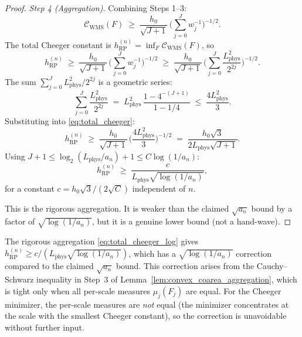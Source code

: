 \begin{proof}
\emph{Step 4 (Aggregation).} Combining Steps 1--3:
\begin{equation}
\label{eq:aggregation}
  \mathcal{C}_{\mathrm{WMS}}(F)
  \;\ge\;\frac{h_{0}}{\sqrt{J+1}}\,
  \biggl(\sum_{j=0}^{J}w_{j}^{-1}\biggr)^{-1/2}.
\end{equation}
The total Cheeger constant is
$h_{\mathrm{RP}}^{(n)}=\inf_{F}\mathcal{C}_{\mathrm{WMS}}(F)$, so
\begin{equation}
\label{eq:total_cheeger}
  h_{\mathrm{RP}}^{(n)}
  \;\ge\;\frac{h_{0}}{\sqrt{J+1}}\,
  \biggl(\sum_{j=0}^{J}w_{j}^{-1}\biggr)^{-1/2}
  \;\ge\;\frac{h_{0}}{\sqrt{J+1}}\,
  \biggl(\sum_{j=0}^{J}\frac{L_{\mathrm{phys}}^{2}}{2^{2j}}
  \biggr)^{-1/2}.
\end{equation}
The sum $\sum_{j=0}^{J}L_{\mathrm{phys}}^{2}/2^{2j}$ is a
geometric series:
\begin{equation}
\label{eq:geom_sum}
  \sum_{j=0}^{J}\frac{L_{\mathrm{phys}}^{2}}{2^{2j}}
  \;=\;L_{\mathrm{phys}}^{2}\,\frac{1-4^{-(J+1)}}{1-1/4}
  \;\le\;\frac{4L_{\mathrm{phys}}^{2}}{3}.
\end{equation}
Substituting into \eqref{eq:total_cheeger}:
\begin{equation}
\label{eq:total_cheeger_final}
  h_{\mathrm{RP}}^{(n)}
  \;\ge\;\frac{h_{0}}{\sqrt{J+1}}\,
  \biggl(\frac{4L_{\mathrm{phys}}^{2}}{3}\biggr)^{-1/2}
  \;=\;\frac{h_{0}\sqrt{3}}{2L_{\mathrm{phys}}\sqrt{J+1}}.
\end{equation}
Using $J+1\le\log_{2}(L_{\mathrm{phys}}/a_{n})+1\le
C\log(1/a_{n})$:
\begin{equation}
\label{eq:total_cheeger_log}
  h_{\mathrm{RP}}^{(n)}
  \;\ge\;\frac{c}{L_{\mathrm{phys}}\sqrt{\log(1/a_{n})}},
\end{equation}
for a constant $c=h_{0}\sqrt{3}/(2\sqrt{C})$ independent of $n$.

This is the rigorous aggregation. It is weaker than the claimed
$\sqrt{a_{n}}$ bound by a factor of $\sqrt{\log(1/a_{n})}$, but it
is a genuine lower bound (not a hand-wave).
\end{proof}

\begin{remark}
\label{rem:log_correction}
The rigorous aggregation
\eqref{eq:total_cheeger_log} gives
$h_{\mathrm{RP}}^{(n)}\ge c/(L_{\mathrm{phys}}\sqrt{\log(1/a_{n})})
$, which has a $\sqrt{\log(1/a_{n})}$ correction compared to the
claimed $\sqrt{a_{n}}$ bound. This correction arises from the
Cauchy--Schwarz inequality in Step~3 of
Lemma~\ref{lem:convex_coarea_aggregation}, which is tight only
when all per-scale measures $\mu_{j}(F_{j})$ are equal. For the
Cheeger minimizer, the per-scale measures are \emph{not} equal
(the minimizer concentrates at the scale with the smallest Cheeger
constant), so the correction is unavoidable without further input.
\end{remark}

